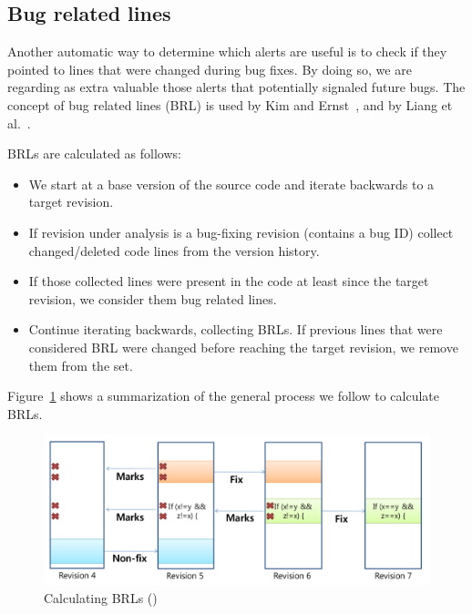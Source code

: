 \subsection{Bug related lines}
\label{method:brls}

Another automatic way to determine which alerts are useful is to check if they pointed to lines that were changed during bug fixes. By doing so, we are regarding as extra valuable those alerts that potentially signaled future bugs. The concept of bug related lines (BRL) is used by Kim and Ernst~\cite{which_warnings}, and by Liang et al.~\cite{automatic_training_set}.

BRLs are calculated as follows:
\begin{itemize}
    \item We start at a base version of the source code and iterate backwards to a target revision. 
    \item If revision under analysis is a bug-fixing revision (contains a bug ID) collect changed/deleted code lines from the version history.
    \item If those collected lines were present in the code at least since the target revision, we consider them bug related lines.
    \item Continue iterating backwards, collecting BRLs. If previous lines that were considered BRL were changed before reaching the target revision, we remove them from the set. 
\end{itemize}

Figure~\ref{fig:calculating-brls} shows a summarization of the general process we follow to calculate BRLs.


\begin{figure}[H]
    \centering
    \includegraphics[scale=0.3]{./src/brl_example.png}
    \caption{Calculating BRLs (\cite{which_warnings})}
    \label{fig:calculating-brls} %
\end{figure}

